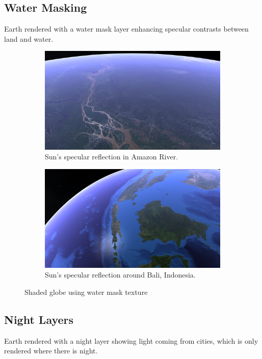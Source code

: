 \subsection{Water Masking}
\FloatBarrier
Earth rendered with a water mask layer enhancing specular contrasts between land and water.
\begin{figure}[h]
    \centering
    \begin{subfigure}[bt]{0.9\textwidth}
        \includegraphics[width=\textwidth]{figures/results/screenshots/specular_brazil.png}
        \caption{Sun's specular reflection in Amazon River.}
    \end{subfigure}
    \begin{subfigure}[bt]{0.9\textwidth}
        \includegraphics[width=\textwidth]{figures/results/screenshots/specular_indonesia.png}
        \caption{Sun's specular reflection around Bali, Indonesia.}
    \end{subfigure}
    \caption{Shaded globe using water mask texture}
\end{figure}

\clearpage
\subsection{Night Layers}
\FloatBarrier
Earth rendered with a night layer showing light coming from cities, which is only rendered where there is night. 


